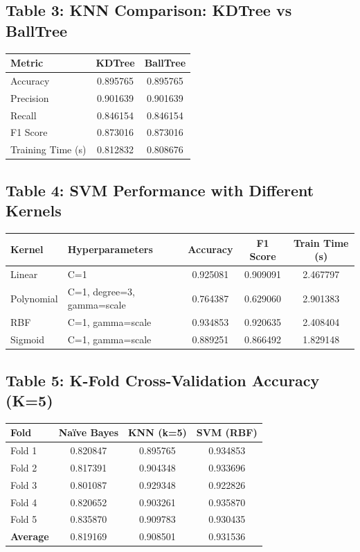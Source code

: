 \documentclass[12pt]{article}
\begin{document}
\vspace{1em}

\subsection*{Table 3: KNN Comparison: KDTree vs BallTree}
\begin{tabular}{|l|c|c|}
\hline
\textbf{Metric} & \textbf{KDTree} & \textbf{BallTree} \\
\hline
Accuracy & 0.895765 & 0.895765 \\
Precision & 0.901639 & 0.901639 \\
Recall & 0.846154 & 0.846154 \\
F1 Score & 0.873016 & 0.873016 \\
Training Time (s) & 0.812832 & 0.808676 \\
\hline
\end{tabular}

\vspace{1em}

\subsection*{Table 4: SVM Performance with Different Kernels}
\begin{tabular}{|l|l|c|c|c|}
\hline
\textbf{Kernel} & \textbf{Hyperparameters} & \textbf{Accuracy} & \textbf{F1 Score} & \textbf{Train Time (s)} \\
\hline
Linear & C=1 & 0.925081 & 0.909091 & 2.467797 \\
Polynomial & C=1, degree=3, gamma=scale & 0.764387 & 0.629060 & 2.901383 \\
RBF & C=1, gamma=scale & 0.934853 & 0.920635 & 2.408404 \\
Sigmoid & C=1, gamma=scale & 0.889251 & 0.866492 & 1.829148 \\
\hline
\end{tabular}

\vspace{1em}

\subsection*{Table 5: K-Fold Cross-Validation Accuracy (K=5)}
\begin{tabular}{|l|c|c|c|}
\hline
\textbf{Fold} & \textbf{Naïve Bayes} & \textbf{KNN (k=5)} & \textbf{SVM (RBF)} \\
\hline
Fold 1 & 0.820847 & 0.895765 & 0.934853 \\
Fold 2 & 0.817391 & 0.904348 & 0.933696 \\
Fold 3 & 0.801087 & 0.929348 & 0.922826 \\
Fold 4 & 0.820652 & 0.903261 & 0.935870 \\
Fold 5 & 0.835870 & 0.909783 & 0.930435 \\
\textbf{Average} & 0.819169 & 0.908501 & 0.931536 \\
\hline
\end{tabular}
\end{document}
